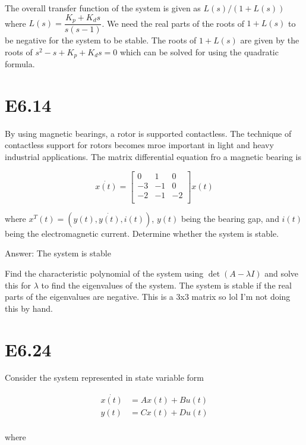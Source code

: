 \documentclass[11pt]{article}
\begin{document}
The overall transfer function of the system is given as $L(s) / (1 + L(s))$ where $L(s) = \dfrac{K_p + K_d s}{s(s - 1)}$. We need the real parts of the roots of $1 + L(s)$ to be negative for the system to be stable. The roots of $1 + L(s)$ are given by the roots of $s^2 - s + K_p + K_d s = 0$ which can be solved for using the quadratic formula.

\section{E6.14}

By using magnetic bearings, a rotor is supported contactless. The technique of contactless support for rotors becomes mroe important in light and heavy industrial applications. The matrix differential equation fro a magnetic bearing is

\[
  \dot{x(t)} = \begin{bmatrix}
    0 & 1 & 0 \\
    -3 & -1 & 0 \\
    -2 & -1 & -2 \\
  \end{bmatrix}
  x(t)
\]

where $x^T(t) = (y(t), \dot{y(t)}, i(t))$, $y(t)$ being the bearing gap, and $i(t)$ being the electromagnetic current. Determine whether the system is stable.

Answer: The system is stable

Find the characteristic polynomial of the system using $\det(A - \lambda I)$ and solve this for $\lambda$ to find the eigenvalues of the system. The system is stable if the real parts of the eigenvalues are negative. This is a 3x3 matrix so lol I'm not doing this by hand.

\section{E6.24}

Consider the system represented in state variable form

\begin{align*}
  \dot{x(t)} &= Ax(t) + Bu(t) \\
  y(t) &= Cx(t) + Du(t) \\
\end{align*}

where
\end{document}
